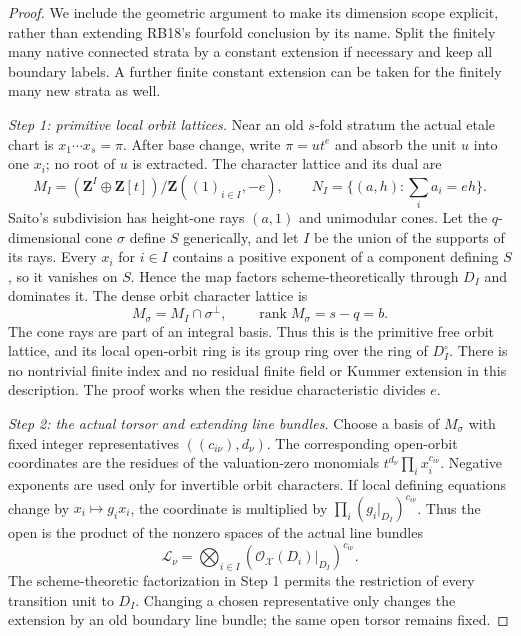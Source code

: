 \begin{proof}
We include the geometric argument to make its dimension scope
explicit, rather than extending RB18's fourfold conclusion by
its name.  Split the finitely many native connected strata
by a constant extension if necessary and keep all boundary
labels.  A further finite constant extension can be taken
for the finitely many new strata as well.

\emph{Step 1: primitive local orbit lattices.}
Near an old $s$-fold stratum the actual etale chart is
$x_1\cdots x_s=\pi$.  After base change, write
$\pi=ut^e$ and absorb the unit $u$ into one $x_i$; no
root of $u$ is extracted.  The character lattice and its dual are
\[
 M_I=(\mathbf Z^I\oplus\mathbf Z[t])/
                    \mathbf Z((1)_{i\in I},-e),
 \qquad
 N_I=\{(a,h):\sum_i a_i=eh\}.
 \tag{RT20.7}\label{r20rt:lattice}
\]
Saito's subdivision has height-one rays $(a,1)$ and
unimodular cones.  Let the $q$-dimensional cone $\sigma$
define $S$ generically, and let $I$ be the union of the
supports of its rays.  Every $x_i$ for $i\in I$ contains
a positive exponent of a component defining $S$, so it
vanishes on $S$.  Hence the map factors scheme-theoretically
through $D_I$ and dominates it.
The dense orbit character lattice is
\[
 M_\sigma=M_I\cap\sigma^\perp,
                    \qquad\operatorname{rank}M_\sigma=s-q=b.
 \tag{RT20.8}\label{r20rt:orbit}
\]
The cone rays are part of an integral basis.  Thus this is
the primitive free orbit lattice, and its local open-orbit
ring is its group ring over the ring of $D_I^\circ$.
There is no nontrivial finite index and no residual finite
field or Kummer extension in this description.  The proof
works when the residue characteristic divides $e$.

\emph{Step 2: the actual torsor and extending line bundles.}
Choose a basis of $M_\sigma$ with fixed integer representatives
$((c_{i\nu}),d_\nu)$.  The corresponding open-orbit
coordinates are the residues of the valuation-zero monomials
$t^{d_\nu}\prod_i x_i^{c_{i\nu}}$.  Negative exponents
are used only for invertible orbit characters.  If local
defining equations change by $x_i\mapsto g_i x_i$, the
coordinate is multiplied by
$\prod_i(g_i|_{D_I})^{c_{i\nu}}$.  Thus the open is the
product of the nonzero spaces of the actual line bundles
\[
 \mathcal L_\nu=
   \bigotimes_{i\in I}
       (\mathcal O_{\mathcal X}(D_i)|_{D_I})^{c_{i\nu}}.
 \tag{RT20.9}\label{r20rt:bundles}
\]
The scheme-theoretic factorization in Step 1 permits the
restriction of every transition unit to $D_I$.  Changing a
chosen representative only changes the extension by an old
boundary line bundle; the same open torsor remains fixed.


\end{proof}
